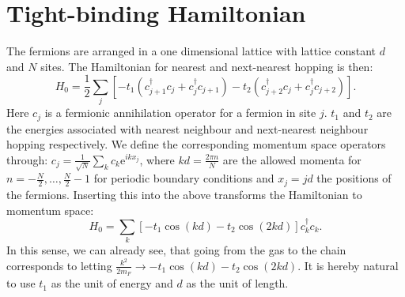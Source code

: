 \section{Tight-binding Hamiltonian} \label{sec.TightbindingHam.lattice}
The fermions are arranged in a one dimensional lattice with lattice constant $d$ and $N$ sites. The Hamiltonian for nearest and next-nearest hopping is then:
\begin{equation}
H_{0} = \frac{1}{2}\sum_{j} \left[- t_1(c^\dagger_{j+1}c_j + c^\dagger_j c_{j + 1}) - t_2(c^\dagger_{j + 2}c_j + c^\dagger_j c_{j + 2}) \right].
\label{eq.Htightbindingrealspace} 
\end{equation}
Here $c_j$ is a fermionic annihilation operator for a fermion in site $j$. $t_1$ and $t_2$ are the energies associated with nearest neighbour and next-nearest neighbour hopping respectively. We define the corresponding momentum space operators through: $c_j = \frac{1}{\sqrt{N}}\sum_{k} c_k \text{e}^{ikx_j}$, where $kd = \frac{2\pi n}{N}$ are the allowed momenta for $n = -\frac{N}{2}, \dots, \frac{N}{2} - 1$ for periodic boundary conditions and $x_j = jd$ the positions of the fermions. Inserting this into the above transforms the Hamiltonian to momentum space:
\begin{equation}
H_{0} = \sum_k \left[ - t_1\cos(kd) - t_2\cos(2kd)\right]c^\dagger_kc_k.
\label{eq.Htightbindingmomentumspace} 
\end{equation}
In this sense, we can already see, that going from the gas to the chain corresponds to letting $\frac{k^2}{2m_F} \to - t_1\cos(kd) - t_2\cos(2kd)$. It is hereby natural to use $t_1$ as the unit of energy and $d$ as the unit of length.


